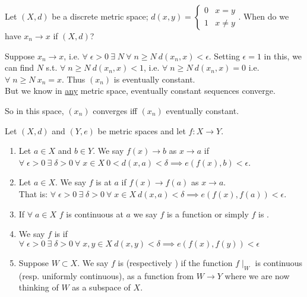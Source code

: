 \begin{example}
    Let $(X, d)$ be a discrete metric space; $d(x, y) = \begin{cases}
        0 & x = y \\
        1 & x \neq y
    \end{cases}$.
    When do we have $x_n \to x$ if $(X, d)$?

    Suppose $x_n \to x$, i.e. $\forall \; \epsilon > 0 \ \exists \; N \ \forall \; n \geq N \ d(x_n, x) < \epsilon$.
    Setting $\epsilon = 1$ in this, we can find $N$ s.t. $\forall \; n \geq N \ d(x_n, x) < 1$, i.e. $\forall \; n \geq N \ d(x_n, x) = 0$ i.e. $\forall \; n \geq N \ x_n = x$.
    Thus $(x_n)$ is eventually constant. \\
    But we know in \underline{any} metric space, eventually constant sequences converge.

    So in this space, $(x_n)$ converges iff $(x_n)$ eventually constant.
\end{example} 

\begin{definition}[Continuity]
    Let $(X, d)$ and $(Y, e)$ be metric spaces and let $f : X \to Y$.
    \begin{enumerate}
        \item Let $a \in X$ and $b \in Y$.
        We say $f(x) \to b$ as $x \to a$ if $\forall \; \epsilon > 0 \ \exists \; \delta > 0 \ \forall \; x \in X \ 0 < d(x, a) < \delta \implies e(f(x), b) < \epsilon$. \label{def:con1}
        \item Let $a \in X$.
        We say $f$ is  at $a$ if $f(x) \to f(a)$ as $x \to a$. \\
        That is: $\forall \; \epsilon > 0 \ \exists \; \delta > 0 \ \forall \; x \in X \ d(x, a) < \delta \implies e(f(x), f(a)) < \epsilon$.
        \item If $\forall \; a \in X$ $f$ is continuous at $a$ we say $f$ is a  function or simply $f$ is .
        \item We say $f$ is  if $\forall \; \epsilon > 0 \ \exists \; \delta > 0 \ \forall \; x,y \in X \ d(x, y) < \delta \implies e(f(x), f(y)) < \epsilon$
        \item Suppose $W \subset X$.
        We say $f$ is  (respectively ) if the function $f\mid_W$ is continuous (resp. uniformly continuous), as a function from $W \to Y$ where we are now thinking of $W$ as a subspace of $X$. \label{def:con5}
    \end{enumerate} 
\end{definition} 

